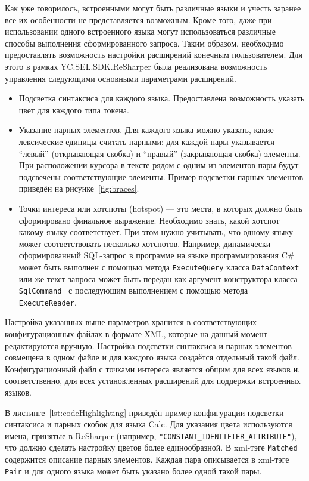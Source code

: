 Как уже говорилось, встроенными могут быть различные языки и учесть заранее все их особенности не представляется возможным. Кроме того, даже при использовании одного встроенного языка могут использоваться различные способы выполнения сформированного запроса. Таким образом, необходимо предоставлять возможность настройки расширений конечным пользователем. Для этого в рамках YC.SEL.SDK.ReSharper была реализована возможность управления следующими основными параметрами расширений. 

\begin{itemize}
    \item Подсветка синтаксиса для каждого языка. Предоставлена возможность указать цвет для каждого типа токена.
    \item Указание парных элементов. Для каждого языка можно указать, какие лексические единицы считать парными: для каждой пары указывается ``левый'' (открывающая скобка) и ``правый'' (закрывающая скобка) элементы. При расположении курсора в тексте рядом с одним из элементов пары будут подсвечены соответствующие элементы. Пример подсветки парных элементов приведён на рисунке~\ref{fig:braces}.
    \item Точки интереса или хотспоты (hotspot) --- это места, в которых должно быть сформировано финальное выражение. Необходимо знать, какой хотспот какому языку соответствует. При этом нужно учитывать, что одному языку может соответствовать несколько хотспотов. Например, динамически сформированный SQL-запрос в программе на языке программирования C\# может быть выполнен с помощью метода \verb|ExecuteQuery| класса \verb|DataContext|~\cite{ExecuteQuery}
     или же текст запроса может быть передан как аргумент конструктора класса \verb|SqlCommand|~\cite{SqlCommand} с последующим выполнением с помощью метода \verb|ExecuteReader|.

\end{itemize}

Настройка указанных выше параметров хранится в соответствующих конфигурационных файлах в формате XML, которые на данный момент редактируются вручную. Настройка подсветки синтаксиса и парных элементов совмещена в одном файле и для каждого языка создаётся отдельный такой файл. Конфигурационный файл с точками интереса является общим для всех языков и, соответственно, для всех установленных расширений для поддержки встроенных языков.

В листинге~\ref{lst:codeHighlighting} приведён пример конфигурации подсветки синтаксиса и парных скобок для языка Calc. Для указания цвета используются имена, принятые в ReSharper (например, \verb|"CONSTANT_IDENTIFIER_ATTRIBUTE"|), что должно сделать настройку цветов более единообразной. В xml-тэге \verb|Matched| содержится описание парных элементов. Каждая пара описывается в xml-тэге \verb|Pair| и для одного языка может быть указано более одной такой пары.

